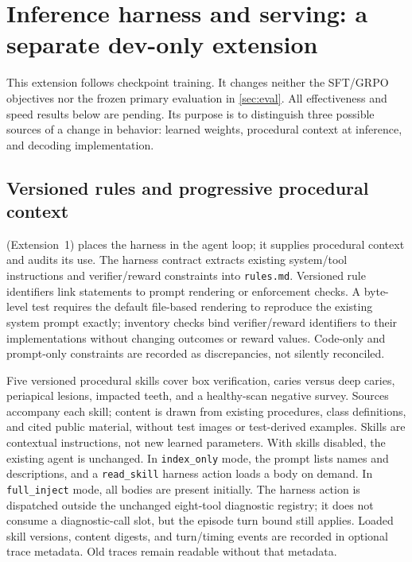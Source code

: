\section{Inference harness and serving: a separate dev-only extension}
\label{sec:harness-serving}

This extension follows checkpoint training. It changes neither the SFT/GRPO objectives nor
the frozen primary evaluation in \cref{sec:eval}. All effectiveness and speed results below
are pending. Its purpose is to distinguish three possible sources of a change in behavior:
learned weights, procedural context at inference, and decoding implementation.

\subsection{Versioned rules and progressive procedural context}
\label{sec:rules-skills}
 (Extension~1) places the harness in the agent loop; it supplies procedural context and audits its use. The harness contract extracts existing system/tool instructions and verifier/reward constraints
into \texttt{rules.md}. Versioned rule identifiers link statements to
prompt rendering or enforcement checks. A byte-level test requires the default file-based rendering
to reproduce the existing system prompt exactly; inventory checks bind verifier/reward
identifiers to their implementations without changing outcomes or reward values. Code-only and
prompt-only constraints are recorded as discrepancies, not silently reconciled.


Five versioned procedural skills cover box verification, caries versus deep caries, periapical
lesions, impacted teeth, and a healthy-scan negative survey. Sources accompany each skill;
content is drawn from existing procedures, class definitions, and cited public material,
without test images or test-derived examples. Skills are contextual instructions, not new
learned parameters. With skills disabled, the existing agent is unchanged. In \texttt{index\_only} mode, the prompt lists names and descriptions, and a
\texttt{read\_skill} harness action loads a body on demand. In \texttt{full\_inject} mode, all
bodies are present initially. The harness action is dispatched outside the unchanged eight-tool
diagnostic registry; it does not consume a diagnostic-call slot, but the episode turn bound
still applies. Loaded skill versions, content digests, and turn/timing events are recorded in
optional trace metadata. Old traces remain readable without that metadata.



